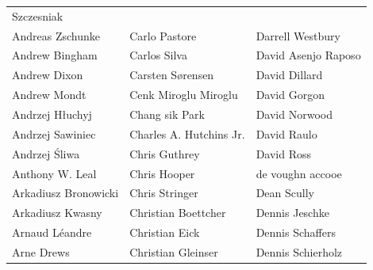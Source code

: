 \begin{small}
\begin{tabular}{p{4cm}p{4cm}p{4cm}}
Szczesniak \\Andreas Zschunke & Carlo Pastore & Darrell Westbury \\Andrew Bingham & Carlos Silva & David Asenjo Raposo \\Andrew Dixon & Carsten Sørensen & David Dillard \\Andrew Mondt & Cenk Miroglu Miroglu & David Gorgon \\Andrzej Hłuchyj & Chang sik Park & David Norwood \\Andrzej Sawiniec & Charles A. Hutchins Jr. & David Raulo \\Andrzej Śliwa & Chris Guthrey & David Ross \\Anthony W. Leal & Chris Hooper & de voughn accooe \\Arkadiusz Bronowicki & Chris Stringer & Dean Scully \\Arkadiusz Kwasny & Christian Boettcher & Dennis Jeschke \\Arnaud Léandre & Christian Eick & Dennis Schaffers \\Arne Drews & Christian Gleinser & Dennis Schierholz \\
\end{tabular}
\newpage
\setlength{\tabcolsep}{1mm}
\begin{tabular}{p{4cm}p{4cm}p{4cm}}

\end{tabular}
\end{small}
